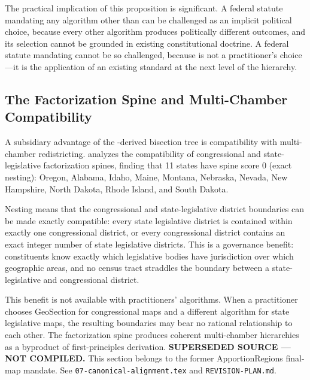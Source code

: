The practical implication of this proposition is significant.
A federal statute mandating any algorithm other than \ar{} can be challenged
as an implicit political choice, because every other algorithm produces
politically different outcomes, and its selection cannot be grounded in
existing constitutional doctrine.
A federal statute mandating \ar{} cannot be so challenged, because \ar{}
is not a practitioner's choice---it is the application of an existing
standard at the next level of the hierarchy.

\subsection{The Factorization Spine and Multi-Chamber Compatibility}

A subsidiary advantage of the \hh{}-derived bisection tree is compatibility
with multi-chamber redistricting.
\citet{b13paper} analyzes the compatibility of congressional and state-legislative
factorization spines, finding that 11 states have spine score 0 (exact
nesting): Oregon, Alabama, Idaho, Maine, Montana, Nebraska, Nevada,
New Hampshire, North Dakota, Rhode Island, and South Dakota.

Nesting means that the congressional and state-legislative district boundaries
can be made exactly compatible: every state legislative district is contained
within exactly one congressional district, or every congressional district
contains an exact integer number of state legislative districts.
This is a governance benefit: constituents know exactly which legislative
bodies have jurisdiction over which geographic areas, and no census tract
straddles the boundary between a state-legislative and congressional district.

This benefit is not available with practitioners' algorithms.
When a practitioner chooses GeoSection for congressional maps and
a different algorithm for state legislative maps, the resulting boundaries
may bear no rational relationship to each other.
The \hh{} factorization spine produces coherent multi-chamber hierarchies
as a byproduct of first-principles derivation.
\noindent\textbf{SUPERSEDED SOURCE --- NOT COMPILED.} This section belongs to
the former ApportionRegions final-map mandate. See
\texttt{07-canonical-alignment.tex} and \texttt{REVISION-PLAN.md}.
